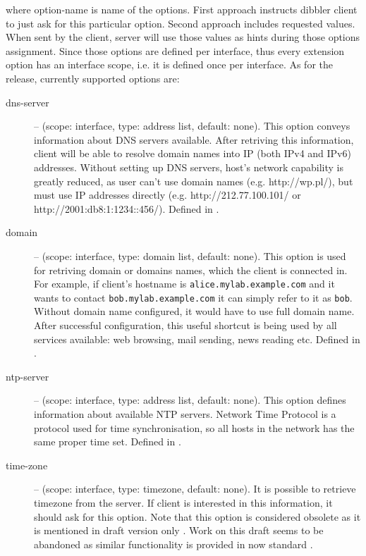 where option-name is name of the options. First approach instructs
dibbler client to just ask for this particular option. Second approach
includes requested values. When sent by the client, server will use
those values as hints during those options assignment. Since those
options are defined per interface, thus every extension option has an
interface scope, i.e. it is defined once per interface. As for the
\version release, currently supported options are:

\begin{description}
 \item[dns-server] -- (scope: interface, type: address list, default:
   none). This option conveys information about DNS servers
   available. After retriving this information, client will be able to
   resolve domain names into IP (both IPv4 and IPv6)
   addresses. Without setting up DNS servers, host's network
   capability is greatly reduced, as user can't use domain names
   (e.g. http://wp.pl/), but must use IP addresses directly
   (e.g. http://212.77.100.101/ or
   http://2001:db8:1:1234::456/). Defined in \cite{rfc3596}.
 \item[domain] -- (scope: interface, type: domain list, default:
   none). This option is used for retriving domain or domains names,
   which the client is connected in. For example, if client's hostname
   is \verb+alice.mylab.example.com+ and it wants to contact
   \verb+bob.mylab.example.com+ it can simply refer to it as
   \verb+bob+. Without domain name configured, it would have to use
   full domain name. After successful configuration, this useful
   shortcut is being used by all services available: web browsing,
   mail sending, news reading etc. Defined in \cite{rfc3596}.
 \item[ntp-server] -- (scope: interface, type: address list, default:
   none). This option defines information about available NTP
   servers. Network Time Protocol \cite{rfc2030} is a protocol used
   for time synchronisation, so all hosts in the network has the same
   proper time set. Defined in \cite{rfc4075}.
 \item[time-zone] -- (scope: interface, type: timezone, default:
   none). It is possible to retrieve timezone from the server. If
   client is interested in this information, it should ask for this
   option. Note that this option is considered obsolete as it is
   mentioned in draft version only \cite{draft-timezone}. Work on this
   draft seems to be abandoned as similar functionality is provided in
   now standard \cite{rfc4075}.

\end{description}

